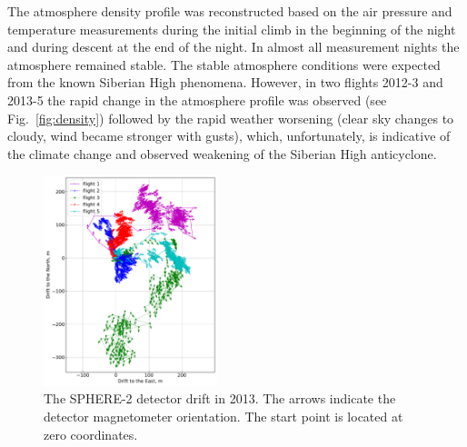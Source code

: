 \documentclass[final,5p,times,twocolumn]{elsarticle}
\begin{document}
The atmosphere density profile was reconstructed based on the air pressure and temperature measurements during the initial climb in the beginning of the night and during descent at the end of the night. In almost all measurement nights the atmosphere remained stable. The stable atmosphere conditions were expected from the known Siberian High phenomena. However, in two flights 2012-3 and 2013-5 the rapid change in the atmosphere profile was observed (see Fig.~\ref{fig:density}) followed by the rapid weather worsening (clear sky changes to cloudy, wind became stronger with gusts), which, unfortunately, is indicative of the climate change and observed weakening of the Siberian High anticyclone. 


\begin{figure}[tb]
    \includegraphics[width=0.45\textwidth]{GPS+quiver.pdf}\hspace{2pc}%
    \caption{The SPHERE-2 detector drift in 2013. The arrows indicate the detector magnetometer orientation. The start point is located at zero coordinates.}
\label{fig:gps_compass}
\end{figure}
\end{document}
